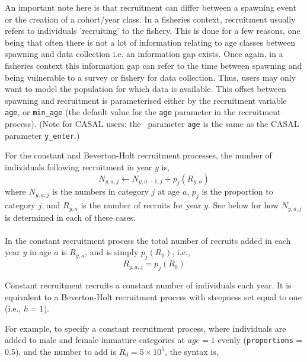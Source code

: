 An important note here is that recruitment can differ between a spawning event or the creation of a cohort/year class. In a fisheries context, recruitment usually refers to individuals 'recruiting' to the fishery. This is done for a few reasons, one being that often there is not a lot of information relating to age classes between spawning and data collection i.e. an information gap exists. Once again, in a fisheries context this information gap can refer to the time between spawning and being vulnerable to a survey or fishery for data collection. Thus, users may only want to model the population for which data is available. This offset between spawning and recruitment is parameterised either by the recruitment variable \texttt{age}, or \texttt{min\_age} (the default value for the \texttt{age} parameter in the recruitment process). (Note for CASAL users: the \CNAME\ parameter \texttt{age} is the same as the CASAL parameter \texttt{y\_enter}.)

For the constant and Beverton-Holt recruitment processes, the  number of individuals following recruitment in year $y$ is,  
\begin{equation}
N_{y,a,j} \leftarrow N_{y,a - 1,j} + p_j(R_{y,a})
\end{equation}
where $N_{y,a,j}$ is the numbers in category $j$ at age $a$, $p_j$ is the proportion to category $j$, and $R_{y,a}$ is the number of recruits for year $y$. See below for how $N_{y,a,j}$ is determined in each of these cases.

\paragraph{}\label{subsubsec:constant-recruitment}

In the constant recruitment process the total number of recruits added in each year $y$ in age $a$ is $R_{y,a}$, and is simply $p_j(R_0)$, i.e.,
\begin{equation}
  R_{y,a,j} = p_j(R_0)
\end{equation}

Constant recruitment recruits a constant number of individuals each year. It is equivalent to a Beverton-Holt recruitment process with steepness set equal to one (i.e., $h=1$).

For example, to specify a constant recruitment process, where individuals are added to male and female immature categories at $age=1$ evenly (\texttt{proportions} = 0.5), and the number to add is $R_0=5 \times 10^5$, the syntax is,

